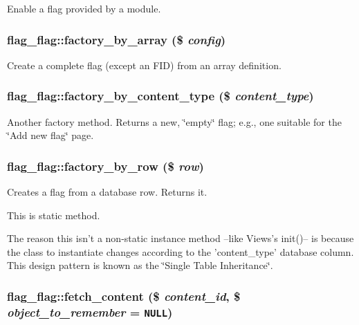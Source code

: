 Enable a flag provided by a module. \hypertarget{classflag__flag_5212e58986627780a60f9d4e03561519}{
\subsubsection[{factory\_\-by\_\-array}]{\setlength{\rightskip}{0pt plus 5cm}flag\_\-flag::factory\_\-by\_\-array (\$ {\em config})}}
\label{classflag__flag_5212e58986627780a60f9d4e03561519}


Create a complete flag (except an FID) from an array definition. \hypertarget{classflag__flag_6441786f4f49a17b877e8bcdb9d6bbf5}{
\subsubsection[{factory\_\-by\_\-content\_\-type}]{\setlength{\rightskip}{0pt plus 5cm}flag\_\-flag::factory\_\-by\_\-content\_\-type (\$ {\em content\_\-type})}}
\label{classflag__flag_6441786f4f49a17b877e8bcdb9d6bbf5}


Another factory method. Returns a new, \char`\"{}empty\char`\"{} flag; e.g., one suitable for the \char`\"{}Add new flag\char`\"{} page. \hypertarget{classflag__flag_7698e8030a65d8260b1e48fef20210b0}{
\subsubsection[{factory\_\-by\_\-row}]{\setlength{\rightskip}{0pt plus 5cm}flag\_\-flag::factory\_\-by\_\-row (\$ {\em row})}}
\label{classflag__flag_7698e8030a65d8260b1e48fef20210b0}


Creates a flag from a database row. Returns it.

This is static method.

The reason this isn't a non-static instance method --like Views's init()-- is because the class to instantiate changes according to the 'content\_\-type' database column. This design pattern is known as the \char`\"{}Single Table Inheritance\char`\"{}. \hypertarget{classflag__flag_c3ce89d9e532fb31b9552ff37b7f0f08}{
\subsubsection[{fetch\_\-content}]{\setlength{\rightskip}{0pt plus 5cm}flag\_\-flag::fetch\_\-content (\$ {\em content\_\-id}, \/  \$ {\em object\_\-to\_\-remember} = {\tt NULL})}}
\label{classflag__flag_c3ce89d9e532fb31b9552ff37b7f0f08}


